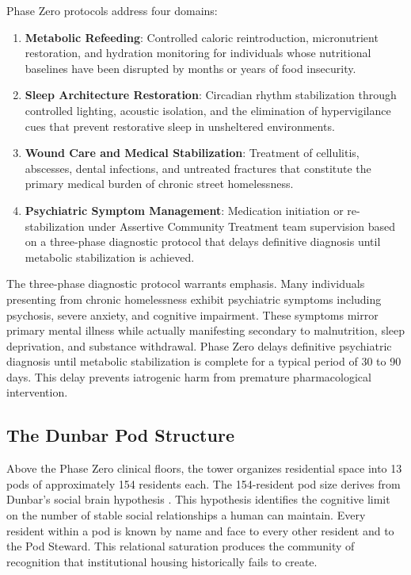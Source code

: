 \documentclass[12pt, letterpaper]{article}
\begin{document}
Phase Zero protocols address four domains:

\begin{enumerate}
    \item \textbf{Metabolic Refeeding}: Controlled caloric reintroduction, micronutrient restoration, and hydration monitoring for individuals whose nutritional baselines have been disrupted by months or years of food insecurity.
    \item \textbf{Sleep Architecture Restoration}: Circadian rhythm stabilization through controlled lighting, acoustic isolation, and the elimination of hypervigilance cues that prevent restorative sleep in unsheltered environments.
    \item \textbf{Wound Care and Medical Stabilization}: Treatment of cellulitis, abscesses, dental infections, and untreated fractures that constitute the primary medical burden of chronic street homelessness.
    \item \textbf{Psychiatric Symptom Management}: Medication initiation or re-stabilization under Assertive Community Treatment team supervision based on a three-phase diagnostic protocol that delays definitive diagnosis until metabolic stabilization is achieved.
\end{enumerate}

The three-phase diagnostic protocol warrants emphasis. Many individuals presenting from chronic homelessness exhibit psychiatric symptoms including psychosis, severe anxiety, and cognitive impairment. These symptoms mirror primary mental illness while actually manifesting secondary to malnutrition, sleep deprivation, and substance withdrawal. Phase Zero delays definitive psychiatric diagnosis until metabolic stabilization is complete for a typical period of 30 to 90 days. This delay prevents iatrogenic harm from premature pharmacological intervention.

\subsection{The Dunbar Pod Structure}

Above the Phase Zero clinical floors, the tower organizes residential space into 13 pods of approximately 154 residents each. The 154-resident pod size derives from Dunbar's social brain hypothesis \citep{dunbar_1992}. This hypothesis identifies the cognitive limit on the number of stable social relationships a human can maintain. Every resident within a pod is known by name and face to every other resident and to the Pod Steward. This relational saturation produces the community of recognition that institutional housing historically fails to create.
\end{document}
